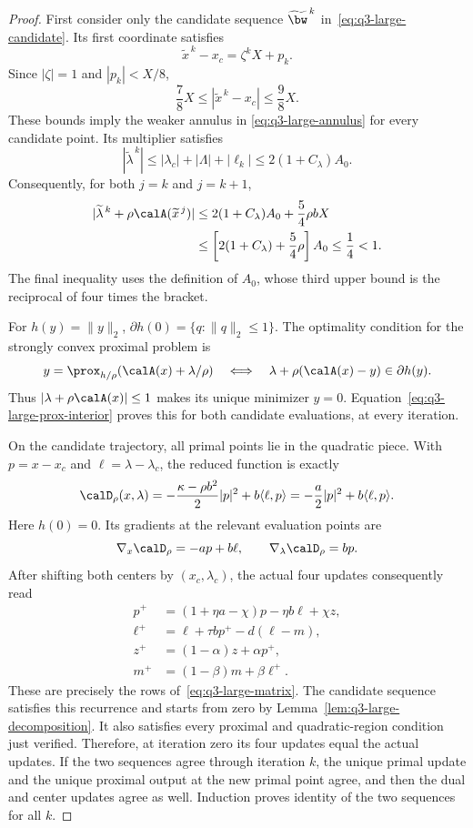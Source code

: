 \begin{proof}
First consider only the candidate sequence
\(\widetilde{\bw}^{\,k}\) in~\eqref{eq:q3-large-candidate}.
Its first coordinate satisfies
\[
\widetilde x^{\,k}-x_c=\zeta^kX+p_k.
\]
Since \(|\zeta|=1\) and \(|p_k|<X/8\),
\[
\frac78X\le|\widetilde x^{\,k}-x_c|\le\frac98X.
\]
These bounds imply the weaker annulus in
\eqref{eq:q3-large-annulus} for every candidate point.
Its multiplier satisfies
\[
|\widetilde\lambda^{\,k}|
\le|\lambda_c|+|\Lambda|+|\ell_k|
\le2(1+C_\lambda)A_0.
\]
Consequently, for both \(j=k\) and \(j=k+1\),
\begin{equation}
\begin{aligned}
|\widetilde\lambda^{\,k}+\rho\calA(\widetilde x^{\,j})|
&\le2(1+C_\lambda)A_0+\frac54\rho bX\\
&\le\left[2(1+C_\lambda)+\frac54\rho\right]A_0
\le\frac14<1.
\end{aligned}
\label{eq:q3-large-prox-interior}
\end{equation}
The final inequality uses the definition of \(A_0\), whose third
upper bound is the reciprocal of four times the bracket.

For \(h(y)=\|y\|_2\),
\(\partial h(0)=\{q:\|q\|_2\le1\}\).
The optimality condition for the strongly convex proximal problem is
\[
y=\prox_{h/\rho}(\calA(x)+\lambda/\rho)
\quad\Longleftrightarrow\quad
\lambda+\rho(\calA(x)-y)\in\partial h(y).
\]
Thus \(|\lambda+\rho\calA(x)|\le1\) makes its unique minimizer
\(y=0\). Equation~\eqref{eq:q3-large-prox-interior} proves this
for both candidate evaluations, at every iteration.

On the candidate trajectory, all primal points lie in the quadratic
piece. With \(p=x-x_c\) and \(\ell=\lambda-\lambda_c\),
the reduced function is exactly
\[
\calD_\rho(x,\lambda)
=-\frac{\kappa-\rho b^2}{2}|p|^2+b\langle\ell,p\rangle
=-\frac a2|p|^2+b\langle\ell,p\rangle.
\]
Here \(h(0)=0\). Its gradients at the relevant evaluation points are
\[
\nabla_x\calD_\rho=-ap+b\ell,
\qquad \nabla_\lambda\calD_\rho=bp.
\]
After shifting both centers by \((x_c,\lambda_c)\), the actual four
updates consequently read
\[
\begin{aligned}
p^+&=(1+\eta a-\chi)p-\eta b\ell+\chi z,\\
\ell^+&=\ell+\tau bp^+-d(\ell-m),\\
z^+&=(1-\alpha)z+\alpha p^+,\\
m^+&=(1-\beta)m+\beta\ell^+.
\end{aligned}
\]
These are precisely the rows of~\eqref{eq:q3-large-matrix}.
The candidate sequence satisfies this recurrence and starts from zero
by Lemma~\ref{lem:q3-large-decomposition}. It also satisfies every
proximal and quadratic-region condition just verified.
Therefore, at iteration zero its four updates equal the actual updates.
If the two sequences agree through iteration \(k\), the unique primal
update and the unique proximal output at the new primal point agree,
and then the dual and center updates agree as well. Induction proves
identity of the two sequences for all \(k\).
\end{proof}


